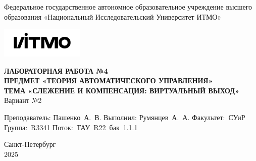 \documentclass[a4paper, 12pt]{article}
\begin{document}
    \begin{titlepage}

        \begin{center}
        Федеральное государственное автономное образовательное учреждение высшего образования
        «Национальный Исследовательский Университет ИТМО»
        \vfill
        
        \includegraphics[width=0.3\textwidth]{itmo.png} %

        {\large\bf ЛАБОРАТОРНАЯ РАБОТА №4}\\
        {\large\bf ПРЕДМЕТ «ТЕОРИЯ АВТОМАТИЧЕСКОГО УПРАВЛЕНИЯ»}\\
        {\large\bf ТЕМА «СЛЕЖЕНИЕ И КОМПЕНСАЦИЯ: ВИРТУАЛЬНЫЙ ВЫХОД»}\\
        Вариант №2
        \vfill

        \begin{flushright}
            \begin{minipage}{.45\textwidth}
            {
                \hbox{Преподаватель:}
                \hbox{Пашенко А. В.}
                \hbox{}
                \hbox{Выполнил:}
                \hbox{Румянцев А. А.}
                \hbox{}
                \hbox{Факультет: СУиР}
                \hbox{Группа: R3341}
                \hbox{Поток: ТАУ R22 бак 1.1.1}
            }
            \end{minipage}
        \end{flushright}
        \vfill
  
        Санкт-Петербург\\
        2025
        \end{center}
    \end{titlepage}
    
    \tableofcontents

    \newpage
\end{document}
